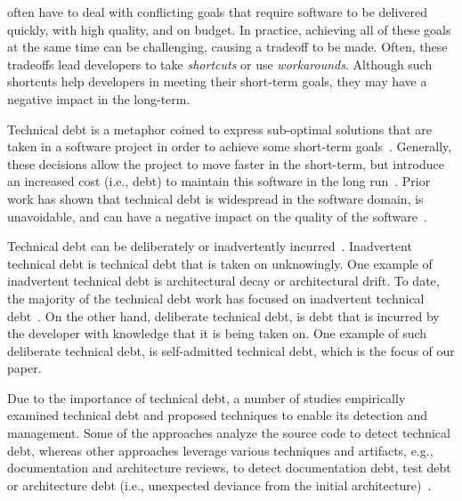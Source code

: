 \documentclass[10pt,journal,compsoc]{IEEEtran}
\newcommand{\revised}[2]{{#1}}
\begin{document}
\maketitle
\IEEEdisplaynontitleabstractindextext
\IEEEpeerreviewmaketitle



 often have to deal with conflicting goals that require software to be delivered quickly, with high quality, and on budget. In practice, achieving all of these goals at the same time can be challenging, causing a tradeoff to be made. Often, these tradeoffs lead developers to take \emph{shortcuts} or use \emph{workarounds}. Although such shortcuts help developers in meeting their short-term goals, they may have a negative impact in the long-term.

Technical debt is a metaphor coined to express sub-optimal solutions that are taken in a software project in order to achieve some short-term goals~\cite{Cunningham1992WPM}. Generally, these decisions allow the project to move faster in the short-term, but introduce an increased cost (i.e., debt) to maintain this software in the long run~\cite{Seaman2011,Kruchten2013IWMTD}.  Prior work has shown that technical debt is widespread in the software domain, is unavoidable, and can have a negative impact on the quality of the software~\cite{Lim2012Software}. 

\revised{Technical debt can be deliberately or inadvertently incurred~\cite{Fowler:quadrant}. Inadvertent technical debt is technical debt that is taken on unknowingly. One example of inadvertent technical debt is architectural decay or architectural drift. To date, the majority of the technical debt work has focused on inadvertent technical debt~\cite{Nord2012WICSA}. On the other hand, deliberate technical debt, is debt that is incurred by the developer with knowledge that it is being taken on. One example of such deliberate technical debt, is self-admitted technical debt, which is the focus of our paper.}{R1-1}


Due to the importance of technical debt, a number of studies empirically examined technical debt and proposed techniques to enable its detection and management. \revised{Some of the approaches analyze the source code to detect technical debt, whereas other approaches leverage various techniques and artifacts, e.g., documentation and architecture reviews, to detect documentation debt, test debt or architecture debt (i.e., unexpected deviance from the initial architecture)~\cite{Alves2016IST,Xiao2016ICSE}.}{R1-2}   
\end{document}
